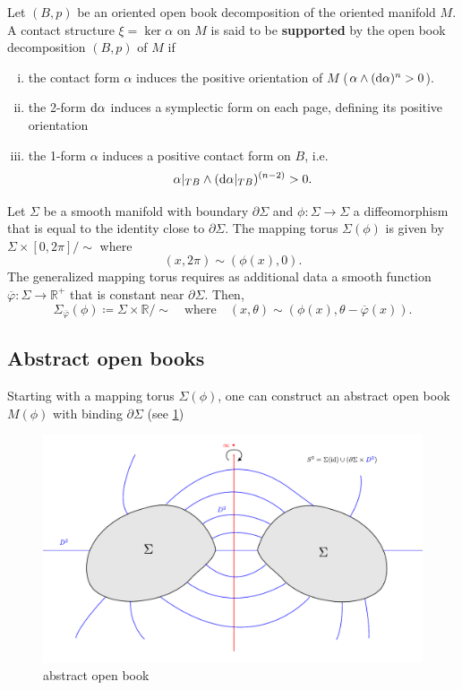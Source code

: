 \begin{definition}\label{def:support}
    Let $(B,p)$ be an oriented open book decomposition of the oriented manifold $M$.
    A contact structure $\xi = \ker \alpha$ on $M$ is said to be \textbf{supported} by the open book decomposition $(B,p)$ of $M$ if
    \begin{enumerate}[(i)]
        \item the contact form $\alpha$ induces the positive orientation of $M$ ($\alpha \wedge (\mathrm{d} \alpha)^n > 0$).
        \item the 2-form $\mathrm{d} \alpha$ induces a symplectic form on each page, defining its positive orientation
        \item the 1-form $\alpha$ induces a positive contact form on $B$, i.e. 
        \[ 
            \alpha|_{TB} \wedge (\mathrm{d} \alpha|_{TB})^{(n-2)} > 0.
        \]
    \end{enumerate}
\end{definition}

\begin{definition}
    Let $\Sigma$ be a smooth manifold with boundary $\partial \Sigma$ and $\phi: \Sigma \to \Sigma$ a diffeomorphism that is equal to the identity close to $\partial \Sigma$.
    The mapping torus $\Sigma(\phi)$ is given by
     $\Sigma \times [0,2\pi]/\sim$ where
     \[
        (x, 2\pi) \sim (\phi(x), 0). 
     \]
     The generalized mapping torus requires as additional data a smooth function $\overline{\varphi}: \Sigma \to \mathbb R^+$ that is constant near $\partial \Sigma$. Then,
     \[
        \Sigma_{\overline{\varphi}}(\phi) \coloneqq \Sigma \times \mathbb R/\sim \quad \text{where} \quad  (x, \theta) \sim (\phi(x), \theta - \overline{\varphi}(x)).
     \]
\end{definition}

\subsection*{Abstract open books}
Starting with a mapping torus $\Sigma(\phi)$, one can construct an abstract open book $M(\phi)$ with binding $\partial \Sigma$ (see \cref{fig:abstract_open_book})
\begin{figure}[ht]
    \includegraphics*[width=\textwidth]{images/abstract_open_book.pdf}
    \caption[abstract open book]{abstract open book}
    \label{fig:abstract_open_book}
\end{figure}

